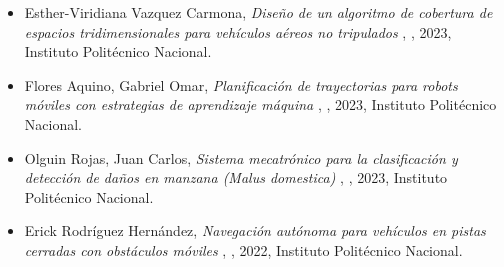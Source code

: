 \begin{itemize} 
\item Esther-Viridiana Vazquez Carmona, \textit{ Diseño de un algoritmo de cobertura de espacios tridimensionales para vehículos aéreos no tripulados }, \href{ https://jivg.org/wp-content/uploads/2023/02/2023_phd_Vazquez.pdf }{\faFilePdfO}, 2023, Instituto Politécnico Nacional. 
\item Flores Aquino, Gabriel Omar, \textit{ Planificación de trayectorias para robots móviles con estrategias de aprendizaje máquina }, \href{ https://jivg.org/wp-content/uploads/2024/01/2023_phd_Flores_Aquino.pdf }{\faFilePdfO}, 2023, Instituto Politécnico Nacional. 
\item Olguin Rojas, Juan Carlos, \textit{ Sistema mecatrónico para la clasificación y detección de daños en manzana (Malus domestica) }, \href{ https://jivg.org/wp-content/uploads/2024/01/2023_phd_Olguin_Rojas.pdf }{\faFilePdfO}, 2023, Instituto Politécnico Nacional. 
\item Erick Rodríguez Hernández, \textit{ Navegación autónoma para vehículos en pistas cerradas con obstáculos móviles }, \href{ https://jivg.org/wp-content/uploads/2022/08/2022_phd_Rodriguez.pdf }{\faFilePdfO}, 2022, Instituto Politécnico Nacional. 
\end{itemize} 
